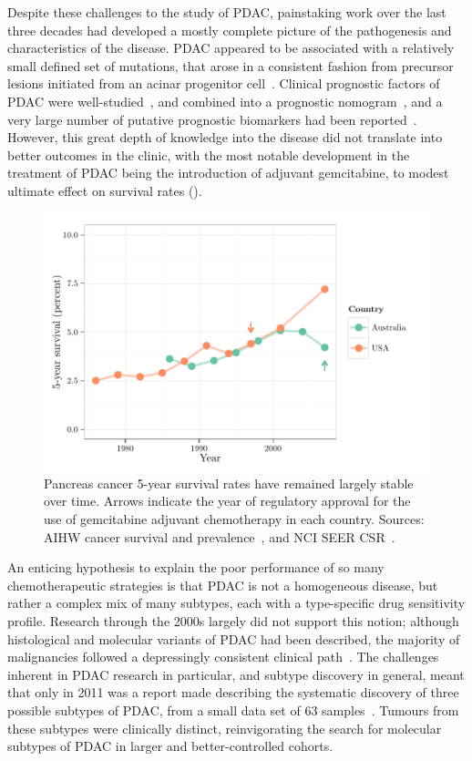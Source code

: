 \documentclass[thesis.tex]{subfiles}
\begin{document}
Despite these challenges to the study of \gls{PDAC}, painstaking work over the last three decades had developed a mostly complete picture of the pathogenesis and characteristics of the disease.  \gls{PDAC} appeared to be associated with a relatively small defined set of mutations, that arose in a consistent fashion from precursor lesions initiated from an acinar progenitor cell~\cite{Hilgers1999, Maitra2008, Kopp2012}.  Clinical prognostic factors of \gls{PDAC} were well-studied~\cite{Garcea2008, Riediger2009}, and combined into a prognostic nomogram~\cite{Brennan2004}, and a very large number of putative prognostic biomarkers had been reported~\cite{Harsha2009}.  However, this great depth of knowledge into the disease did not translate into better outcomes in the clinic, with the most notable development in the treatment of \gls{PDAC} being the introduction of adjuvant gemcitabine, to modest ultimate effect on survival rates ().

\begin{figure}[!htbp]
\centering
\includegraphics[width=.9\linewidth]{analysis/intro/figure/historical-survival-pdac-2}
\caption[Historical survival rates of pancreas cancer]{Pancreas cancer 5-year survival rates have remained largely stable over time.  Arrows indicate the year of regulatory approval for the use of gemcitabine adjuvant chemotherapy in each country.  Sources: AIHW cancer survival and prevalence~\cite{CAN65}, and NCI SEER CSR~\cite{SEER2014}.}\label{fig:intro-historical-panc-surv}
\end{figure}

An enticing hypothesis to explain the poor performance of so many chemotherapeutic strategies is that \gls{PDAC} is not a homogeneous disease, but rather a complex mix of many subtypes, each with a type-specific drug sensitivity profile.   Research through the 2000s largely did not support this notion; although histological and molecular variants of \gls{PDAC} had been described, the majority of malignancies followed a depressingly consistent clinical path~\cite{Maitra2008}.  The challenges inherent in \gls{PDAC} research in particular, and subtype discovery in general, meant that only in 2011 was a report made describing the systematic discovery of three possible subtypes of \gls{PDAC}, from a small data set of 63 samples~\cite{Collisson2011}.  Tumours from these subtypes were clinically distinct, reinvigorating the search for molecular subtypes of \gls{PDAC} in larger and better-controlled cohorts.
\end{document}

